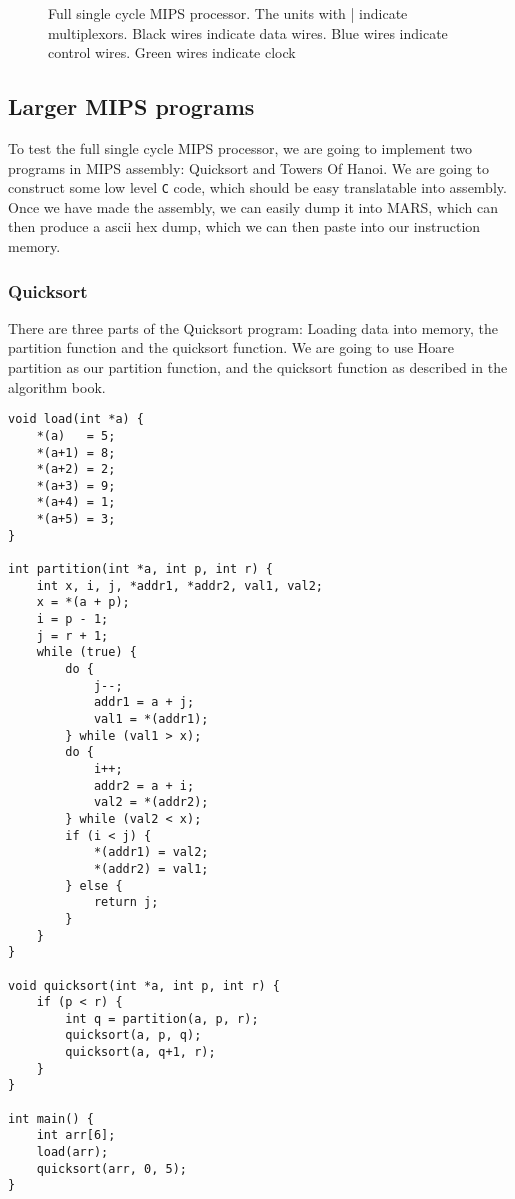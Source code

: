 \begin{figure}
{
    }
    \caption{Full single cycle MIPS processor. The units with | indicate
    multiplexors. Black wires indicate data wires. Blue wires indicate control
    wires. Green wires indicate clock}
    \label{fig:single-proc-full}
\end{figure}

\subsection{Larger MIPS programs}
To test the full single cycle MIPS processor, we are going to implement two
programs in MIPS assembly: Quicksort and Towers Of Hanoi. We are going to
construct some low level \texttt{C} code, which should be easy translatable
into assembly. Once we have made the assembly, we can easily dump it into MARS,
which can then produce a ascii hex dump, which we can then paste into our
instruction memory.

\subsubsection*{Quicksort}
There are three parts of the Quicksort program: Loading data into memory,
the partition function and the quicksort function. We are going to use Hoare
partition as our partition function, and the quicksort function as described in
the algorithm book.

\begin{lstlisting}
void load(int *a) {
    *(a)   = 5;
    *(a+1) = 8;
    *(a+2) = 2;
    *(a+3) = 9;
    *(a+4) = 1;
    *(a+5) = 3;
}

int partition(int *a, int p, int r) {
    int x, i, j, *addr1, *addr2, val1, val2;
    x = *(a + p);
    i = p - 1;
    j = r + 1;
    while (true) {
        do {
            j--;
            addr1 = a + j;
            val1 = *(addr1);
        } while (val1 > x);
        do {
            i++;
            addr2 = a + i;
            val2 = *(addr2);
        } while (val2 < x);
        if (i < j) {
            *(addr1) = val2;
            *(addr2) = val1;
        } else {
            return j;
        }
    }
}

void quicksort(int *a, int p, int r) {
    if (p < r) {
        int q = partition(a, p, r);
        quicksort(a, p, q);
        quicksort(a, q+1, r);
    }
}

int main() {
    int arr[6];
    load(arr);
    quicksort(arr, 0, 5);
}
\end{lstlisting}

